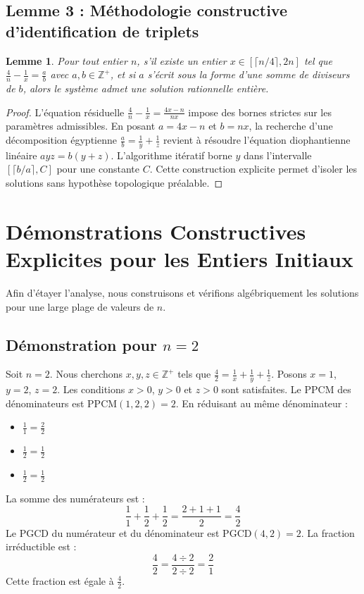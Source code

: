 \documentclass[11pt,a4paper]{article}
\newtheorem{lemma}[theorem]{Lemme}
\begin{document}
\subsection{Lemme 3 : Méthodologie constructive d'identification de triplets}

\begin{lemma}
Pour tout entier $n$, s'il existe un entier $x \in [\lceil n/4 \rceil, 2n]$ tel que $\frac{4}{n} - \frac{1}{x} = \frac{a}{b}$ avec $a, b \in \mathbb{Z}^{+}$, et si $a$ s'écrit sous la forme d'une somme de diviseurs de $b$, alors le système admet une solution rationnelle entière.
\end{lemma}

\begin{proof}
L'équation résiduelle $\frac{4}{n} - \frac{1}{x} = \frac{4x-n}{nx}$ impose des bornes strictes sur les paramètres admissibles. En posant $a = 4x-n$ et $b = nx$, la recherche d'une décomposition égyptienne $\frac{a}{b} = \frac{1}{y} + \frac{1}{z}$ revient à résoudre l'équation diophantienne linéaire $a y z = b(y + z)$. L'algorithme itératif borne $y$ dans l'intervalle $[\lceil b/a \rceil, C]$ pour une constante $C$. Cette construction explicite permet d'isoler les solutions sans hypothèse topologique préalable.
\end{proof}


\section{Démonstrations Constructives Explicites pour les Entiers Initiaux}

Afin d'étayer l'analyse, nous construisons et vérifions algébriquement les solutions pour une large plage de valeurs de $n$.

\subsection{Démonstration pour $n = 2$}
Soit $n = 2$. Nous cherchons $x, y, z \in \mathbb{Z}^{+}$ tels que $\frac{4}{2} = \frac{1}{x} + \frac{1}{y} + \frac{1}{z}$.
Posons $x = 1$, $y = 2$, $z = 2$.
Les conditions $x > 0$, $y > 0$ et $z > 0$ sont satisfaites.
Le PPCM des dénominateurs est $\text{PPCM}(1, 2, 2) = 2$.
En réduisant au même dénominateur :
\begin{itemize}
    \item $\frac{1}{1} = \frac{2}{2}$
    \item $\frac{1}{2} = \frac{1}{2}$
    \item $\frac{1}{2} = \frac{1}{2}$
\end{itemize}
La somme des numérateurs est :
$$ \frac{1}{1} + \frac{1}{2} + \frac{1}{2} = \frac{2 + 1 + 1}{2} = \frac{4}{2} $$
Le PGCD du numérateur et du dénominateur est $\text{PGCD}(4, 2) = 2$.
La fraction irréductible est :
$$ \frac{4}{2} = \frac{4 \div 2}{2 \div 2} = \frac{2}{1} $$
Cette fraction est égale à $\frac{4}{2}$.
\end{document}
